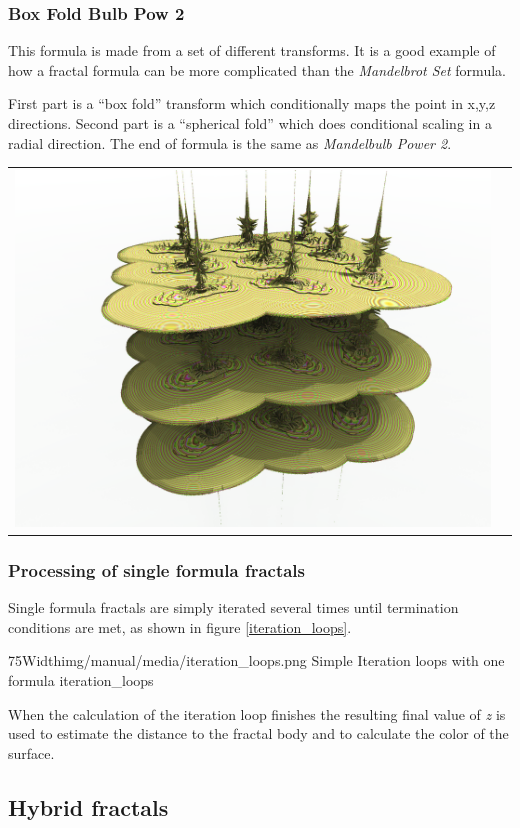 \subsubsection{Box Fold Bulb Pow 2}

This formula is made from a set of different transforms. It is a good example of
how a fractal formula can be more complicated than the
\emph{Mandelbrot Set} formula.

First part is a ``box fold'' transform which conditionally maps the point in x,y,z  directions. Second part is a ``spherical fold'' which does conditional scaling in a radial direction.
The end of formula is the same as \emph{Mandelbulb Power 2}.

\begin{tabular}{l l}
	\includegraphics[width=0.3\linewidth]{img/manual/media/formula_box_fold_pwr2.png}	
	& 
	\begin{minipage}[b]{0.5\linewidth}
		
	\end{minipage}
\end{tabular} 

\subsubsection{Processing of single formula fractals}

Single formula fractals are simply iterated several times until termination conditions are met, as shown in figure \ref{iteration_loops}. \nolinebreak \nopagebreak


\simpleImageWithCaption75Width{img/manual/media/iteration_loops.png}
{Simple Iteration loops with one formula}
{iteration_loops}

When the calculation of the iteration loop finishes the resulting final value of \emph{z} is
used to estimate the distance to the fractal body and to calculate the color of the surface.

\subsection{Hybrid fractals}

